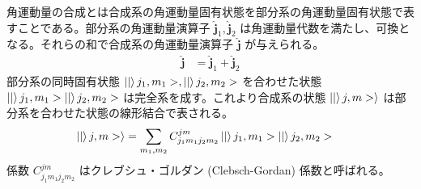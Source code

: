 \documentclass[uplatex,dvipdfmx,a4paper,11pt]{jlreq}
\numberwithin{equation}{section}
\theoremstyle{definition}
\begin{document}
\begin{definition}[角運動量の合成]
  角運動量の合成とは合成系の角運動量固有状態を部分系の角運動量固有状態で表すことである。部分系の角運動量演算子 $\hat{\bm{j}}_1, \hat{\bm{j}}_2$ は角運動量代数を満たし、可換となる。それらの和で合成系の角運動量演算子 $\hat{\bm{j}}$ が与えられる。
  \begin{align}
    \hat{\bm{j}} & = \hat{\bm{j}}_1 + \hat{\bm{j}}_2
  \end{align}
  部分系の同時固有状態 $\ket|j_1, m_1>, \ket|j_2, m_2>$ を合わせた状態 $\ket|j_1, m_1>\ket|j_2, m_2>$ は完全系を成す。これより合成系の状態 $\ket|j, m>\rangle$ は部分系を合わせた状態の線形結合で表される。
  \begin{align}
    \ket|j, m>\rangle & = \sum_{m_1, m_2}C_{j_1m_1j_2m_2}^{jm}\ket|j_1, m_1>\ket|j_2, m_2>
  \end{align}
  係数 $C_{j_1m_1j_2m_2}^{jm}$ はクレブシュ・ゴルダン (Clebsch-Gordan) 係数と呼ばれる。
\end{definition}
\end{document}
